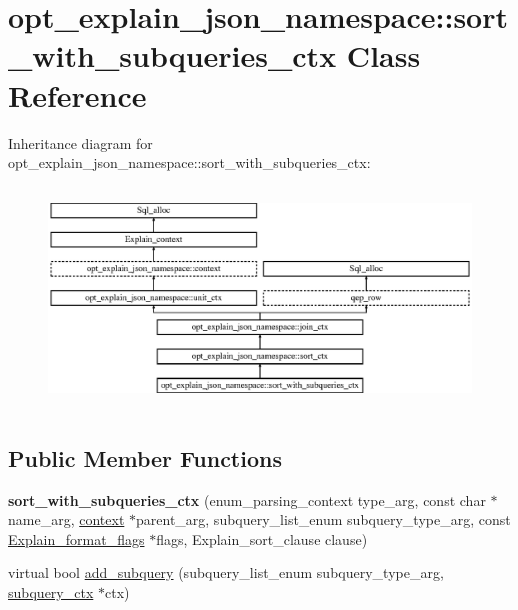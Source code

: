 \hypertarget{classopt__explain__json__namespace_1_1sort__with__subqueries__ctx}{}\section{opt\+\_\+explain\+\_\+json\+\_\+namespace\+:\+:sort\+\_\+with\+\_\+subqueries\+\_\+ctx Class Reference}
\label{classopt__explain__json__namespace_1_1sort__with__subqueries__ctx}
Inheritance diagram for opt\+\_\+explain\+\_\+json\+\_\+namespace\+:\+:sort\+\_\+with\+\_\+subqueries\+\_\+ctx\+:\begin{figure}[H]
\begin{center}
\leavevmode
\includegraphics[height=5.903615cm]{classopt__explain__json__namespace_1_1sort__with__subqueries__ctx}
\end{center}
\end{figure}
\subsection*{Public Member Functions}
\begin{DoxyCompactItemize}
\item 
\mbox{\label{classopt__explain__json__namespace_1_1sort__with__subqueries__ctx_ab3dcbe1946e997de5c966b809f57cb9d}} 
{\bfseries sort\+\_\+with\+\_\+subqueries\+\_\+ctx} (enum\+\_\+parsing\+\_\+context type\+\_\+arg, const char $\ast$name\+\_\+arg, \mbox{\hyperlink{classopt__explain__json__namespace_1_1context}{context}} $\ast$parent\+\_\+arg, subquery\+\_\+list\+\_\+enum subquery\+\_\+type\+\_\+arg, const \mbox{\hyperlink{classExplain__format__flags}{Explain\+\_\+format\+\_\+flags}} $\ast$flags, Explain\+\_\+sort\+\_\+clause clause)
\item 
virtual bool \mbox{\hyperlink{classopt__explain__json__namespace_1_1sort__with__subqueries__ctx_a57c77821336044d261cca101925dfdf2}{add\+\_\+subquery}} (subquery\+\_\+list\+\_\+enum subquery\+\_\+type\+\_\+arg, \mbox{\hyperlink{classopt__explain__json__namespace_1_1subquery__ctx}{subquery\+\_\+ctx}} $\ast$ctx)
\end{DoxyCompactItemize}
